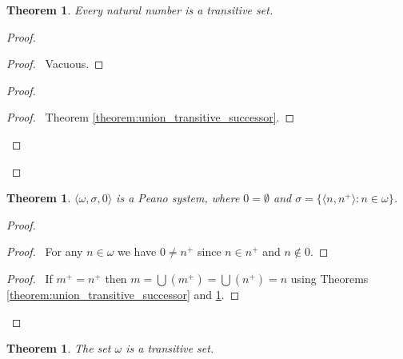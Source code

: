 \documentclass{article}
\let\qed\relax
\newtheorem{theorem}[axiom]{Theorem}
\theoremstyle{definition}
\newcommand{\ran}{\ensuremath{\operatorname{ran}}}
\begin{document}
    \begin{theorem}
        \label{theorem:natural_number_transitive}
        Every natural number is a transitive set.
    \end{theorem}

    \begin{proof}
        \pf
        \begin{proof}
            \pf\ Vacuous.
        \end{proof}
        \begin{proof}
            \begin{proof}
                \pf\ Theorem \ref{theorem:union_transitive_successor}.
            \end{proof}
        \end{proof}
        \qed
    \end{proof}

    \begin{theorem}
        $\langle \omega, \sigma, 0 \rangle$ is a Peano system, where $0 = \emptyset$ and 
        $\sigma = \{ \langle n, n^+ \rangle : n \in \omega \}$.
    \end{theorem}

    \begin{proof}
        \pf
        \step{1}{$0 \notin \ran \sigma$}
        \begin{proof}
            \pf\ For any $n \in \omega$ we have $0 \neq n^+$ since $n \in n^+$
            and $n \notin 0$.
        \end{proof}
        \begin{proof}
            \pf\ If $m^+ = n^+$ then $m = \bigcup (m^+) = \bigcup (n^+) = n$ using Theorems
            \ref{theorem:union_transitive_successor} and \ref{theorem:natural_number_transitive}.
        \end{proof}
        \qed
    \end{proof}

    \begin{theorem}
        The set $\omega$ is a transitive set.
    \end{theorem}
\end{document}
